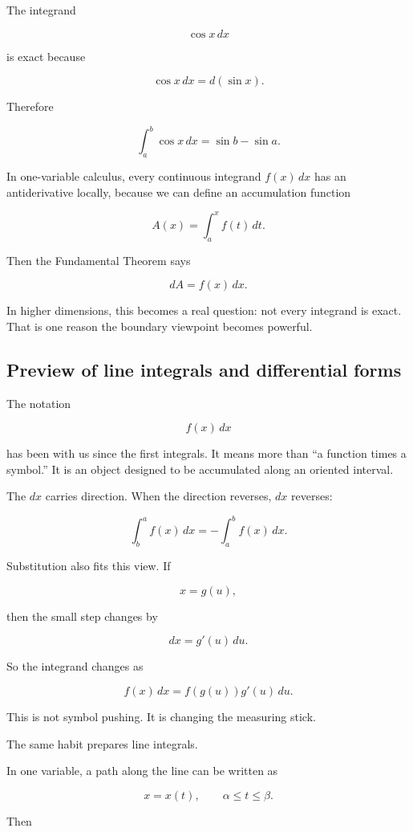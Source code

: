 The integrand

\[
\cos x\,dx
\]

is exact because

\[
\cos x\,dx=d(\sin x).
\]

Therefore

\[
\int_a^b \cos x\,dx
=
\sin b-\sin a.
\]

In one-variable calculus, every continuous integrand \(f(x)\,dx\) has an antiderivative
locally, because we can define an accumulation function

\[
A(x)=\int_a^x f(t)\,dt.
\]

Then the Fundamental Theorem says

\[
dA=f(x)\,dx.
\]

In higher dimensions, this becomes a real question: not every integrand is exact.  That
is one reason the boundary viewpoint becomes powerful.

\subsection{Preview of line integrals and differential forms}
\label{subsec:preview-line-integrals-differential-forms}

The notation

\[
f(x)\,dx
\]

has been with us since the first integrals.  It means more than ``a function times a
symbol.''  It is an object designed to be accumulated along an oriented interval.

The \(dx\) carries direction.  When the direction reverses, \(dx\) reverses:

\[
\int_b^a f(x)\,dx=-\int_a^b f(x)\,dx.
\]

Substitution also fits this view.  If

\[
x=g(u),
\]

then the small step changes by

\[
dx=g'(u)\,du.
\]

So the integrand changes as

\[
f(x)\,dx
=
f(g(u))g'(u)\,du.
\]

This is not symbol pushing.  It is changing the measuring stick.

The same habit prepares line integrals.

In one variable, a path along the line can be written as

\[
x=x(t),
\qquad \alpha\le t\le \beta.
\]

Then

